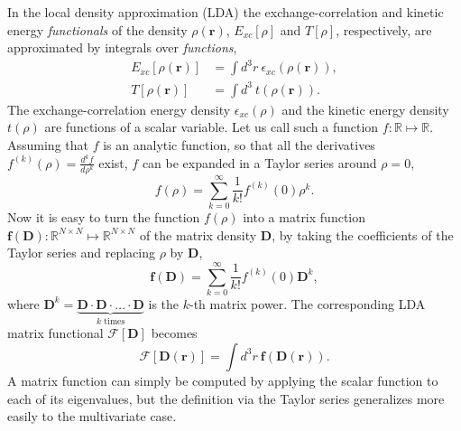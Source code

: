 \documentclass[journal=jpclcd,manuscript=letter]{achemso}
\newcommand\m[1]{\mathbf{#1}}
\renewcommand\vec[1]{\mathbf{#1}}
\begin{document}
In the local density approximation (LDA) the exchange-correlation and kinetic energy \emph{functionals} of the density $\rho(\vec{r})$,
$E_{xc}[\rho]$ and $T[\rho]$, respectively,
are approximated by integrals over \emph{functions},
\begin{align}
  E_{xc}[\rho(\vec{r})] &= \int d^3\!r ~ \epsilon_{xc}(\rho(\vec{r})), \\
  T[\rho(\vec{r})] &= \int d^3\! ~ t(\rho(\vec{r})).
\end{align}
The exchange-correlation energy density $\epsilon_{xc}(\rho)$ and the kinetic energy density $t(\rho)$ are functions
of a scalar variable. Let us call such a function $f: \mathbb{R} \mapsto \mathbb{R}$.
Assuming that $f$ is an analytic function, so that all the derivatives $f^{(k)}(\rho) = \frac{d^k f}{d\rho^k}$ exist,
$f$ can be expanded in a Taylor series around $\rho=0$,
\begin{equation}
 f(\rho) = \sum_{k=0}^{\infty} \frac{1}{k!} f^{(k)}(0) \rho^k.
\end{equation}
Now it is easy to turn the function $f(\rho)$ into a matrix function $\m{f}(\m{D}) : \mathbb{R}^{N \times N} \mapsto \mathbb{R}^{N \times N}$
of the matrix density $\m{D}$, by taking the coefficients of the Taylor series and replacing $\rho$ by $\m{D}$,
\begin{equation}
 \m{f}(\m{D}) = \sum_{k=0}^{\infty} \frac{1}{k!} f^{(k)}(0) \m{D}^k,
\end{equation}
where $\m{D}^k = \underbrace{\m{D} \cdot \m{D} \cdot \ldots \cdot \m{D}}_{\text{$k$ times}}$ is the $k$-th matrix power.
The corresponding LDA matrix functional $\m{\mathcal{F}}[\m{D}]$ becomes
\begin{equation}
  \m{\mathcal{F}}[\m{D}(\vec{r})] = \int d^3\!r ~ \m{f}(\m{D}(\vec{r})).
\end{equation}
A matrix function can simply be computed by applying the scalar function to each of its eigenvalues, but the definition
via the Taylor series generalizes more easily to the multivariate case.
\end{document}
